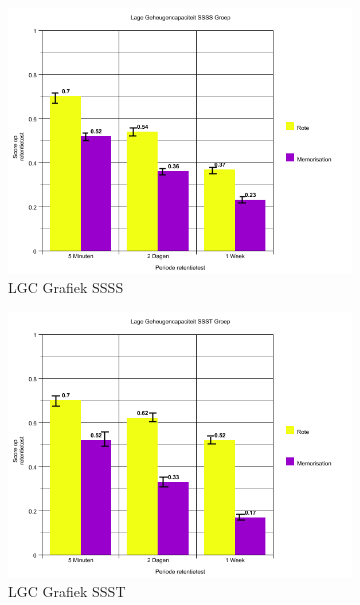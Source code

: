 \documentclass{hogent-article}
\begin{document}
\begin{figure}[H]
    \begin{subfigure}{0.45\textwidth}
        \includegraphics[width=\linewidth]{graph2}
        \caption{LGC Grafiek SSSS}
    \end{subfigure}
    \begin{subfigure}{0.45\textwidth}
        \includegraphics[width=\linewidth]{graph4}
        \caption{LGC Grafiek SSST}
    \end{subfigure}
    \begin{subfigure}{0.45\textwidth}

\end{subfigure}
\end{figure}
\end{document}
